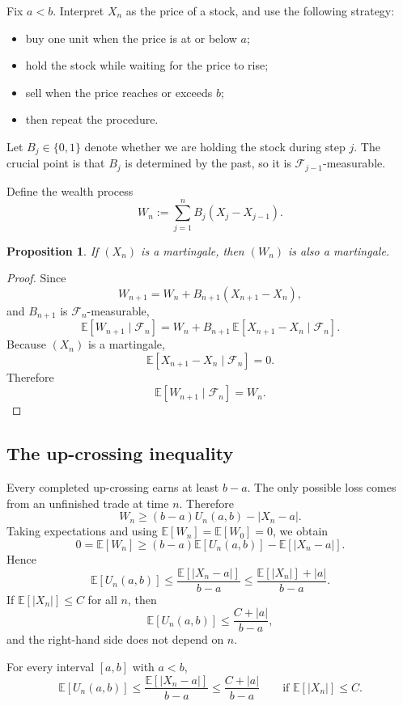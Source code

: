 \documentclass[11pt]{article}
\newtheorem{proposition}[theorem]{Proposition}
\theoremstyle{definition}
\begin{document}
Fix \(a<b\). Interpret \(X_n\) as the price of a stock, and use the following strategy:
\begin{itemize}[leftmargin=2em]
    \item buy one unit when the price is at or below \(a\);
    \item hold the stock while waiting for the price to rise;
    \item sell when the price reaches or exceeds \(b\);
    \item then repeat the procedure.
\end{itemize}

Let \(B_j\in\{0,1\}\) denote whether we are holding the stock during step \(j\). The crucial point is that \(B_j\) is determined by the past, so it is \(\mathcal F_{j-1}\)-measurable.

Define the wealth process
\[
W_n:=\sum_{j=1}^n B_j(X_j-X_{j-1}).
\]

\begin{proposition}
If \((X_n)\) is a martingale, then \((W_n)\) is also a martingale.
\end{proposition}

\begin{proof}
Since
\[
W_{n+1}=W_n+B_{n+1}(X_{n+1}-X_n),
\]
and \(B_{n+1}\) is \(\mathcal F_n\)-measurable,
\[
\mathbb E[W_{n+1}\mid \mathcal F_n]
=
W_n+B_{n+1}\,\mathbb E[X_{n+1}-X_n\mid \mathcal F_n].
\]
Because \((X_n)\) is a martingale,
\[
\mathbb E[X_{n+1}-X_n\mid \mathcal F_n]=0.
\]
Therefore
\[
\mathbb E[W_{n+1}\mid \mathcal F_n]=W_n.
\]
\end{proof}

\subsection{The up-crossing inequality}

Every completed up-crossing earns at least \(b-a\). The only possible loss comes from an unfinished trade at time \(n\). Therefore
\[
W_n\ge (b-a)U_n(a,b)-|X_n-a|.
\]
Taking expectations and using \(\mathbb E[W_n]=\mathbb E[W_0]=0\), we obtain
\[
0=\mathbb E[W_n]
\ge
(b-a)\mathbb E[U_n(a,b)]-\mathbb E[|X_n-a|].
\]
Hence
\[
\mathbb E[U_n(a,b)]
\le
\frac{\mathbb E[|X_n-a|]}{b-a}
\le
\frac{\mathbb E[|X_n|]+|a|}{b-a}.
\]
If \(\mathbb E[|X_n|]\le C\) for all \(n\), then
\[
\mathbb E[U_n(a,b)]
\le
\frac{C+|a|}{b-a},
\]
and the right-hand side does not depend on \(n\).

\begin{keyformula}
For every interval \([a,b]\) with \(a<b\),
\[
\mathbb E[U_n(a,b)]
\le
\frac{\mathbb E[|X_n-a|]}{b-a}
\le
\frac{C+|a|}{b-a}
\qquad \text{if } \mathbb E[|X_n|]\le C.
\]
\end{keyformula}
\end{document}
